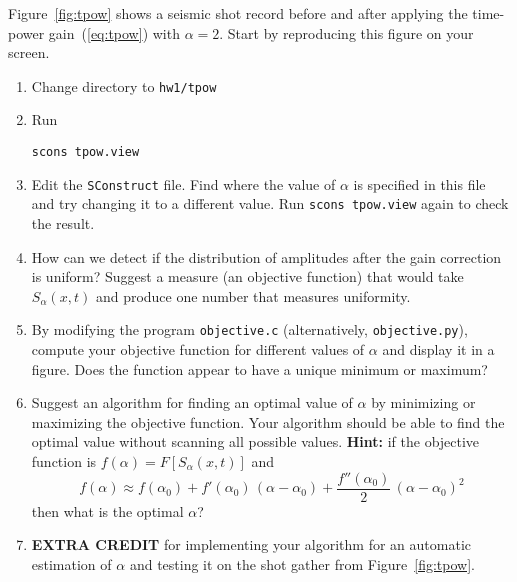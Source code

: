 
Figure~\ref{fig:tpow} shows a seismic shot record before and after
applying the time-power gain~(\ref{eq:tpow}) with $\alpha=2$. Start
by reproducing this figure on your screen.

\begin{enumerate}
\item Change directory to \verb#hw1/tpow#
\item Run
\begin{verbatim}
scons tpow.view
\end{verbatim}
\item Edit the \texttt{SConstruct} file. Find where the value of
  $\alpha$ is specified in this file and try changing it to a
  different value. Run \texttt{scons tpow.view} again to check the result.
\item How can we detect if the distribution of amplitudes after
  the gain correction is uniform? Suggest a measure (an objective
  function) that would take $S_\alpha(x,t)$ and produce one number that
  measures uniformity.
\item By modifying the program \texttt{objective.c} (alternatively,
  \texttt{objective.py}), compute your objective function for
  different values of $\alpha$ and display it in a figure.  Does the
  function appear to have a unique minimum or maximum?

\lstset{language=c,numbers=left,numberstyle=\tiny,showstringspaces=false}


\lstset{language=python,numbers=left,numberstyle=\tiny,showstringspaces=false}


\item Suggest an algorithm for finding an optimal value of $\alpha$ by
  minimizing or maximizing the objective function. Your algorithm
  should be able to find the optimal value without scanning all
  possible values. \textbf{Hint:} if the objective function is
  $f(\alpha)=F[S_\alpha(x,t)]$ and 
\begin{equation}
\label{alpha}                      
f(\alpha) \approx f(\alpha_0) + 
  f'(\alpha_0)\,(\alpha-\alpha_0) + \frac{f''(\alpha_0)}{2}\,(\alpha-\alpha_0)^2
\end{equation}
then what is the optimal $\alpha$?
\item \textbf{EXTRA CREDIT} for implementing your algorithm for an automatic 
estimation of $\alpha$ and testing it on the shot gather from
Figure~\ref{fig:tpow}.

\end{enumerate}

